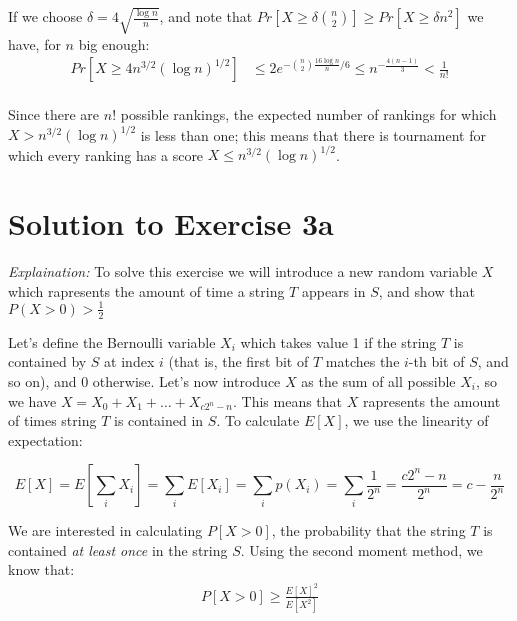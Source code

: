 \documentclass[a4paper,german]{article}
\begin{document}
If we choose $\delta = 4\sqrt{\frac{\log n}{n}}$, and note that $Pr [ X \geq \delta {n \choose 2} ] \geq Pr [ X \geq \delta n^2 ]  $ we have, for $n$ big enough:
\begin{equation}
\begin{aligned} 
	Pr [ X \geq 4n^{3/2}(\log n)^{1/2} ] &\leq 2 e^{-{n \choose 2}\frac{16\log n}{n} / 6} \leq 
	n^{-\frac{4(n-1)}{3}} < \frac{1}{n!}\\
\end{aligned}
\end{equation}

Since there are $n!$ possible rankings, the expected number of rankings for which $X > n^{3/2}(\log n)^{1/2}$ is less than one; this means that there is tournament for which every ranking has a score $X \leq n^{3/2}(\log n)^{1/2}$.





\section*{Solution to Exercise 3a}

\emph{Explaination:} To solve this exercise we will introduce a new random variable $X$ which
rapresents the amount of time a string $T$ appears in $S$, and show that $P(X > 0) > \frac{1}{2}$

\vspace{1em}

Let's define the Bernoulli variable $X_i$ which takes value 1 if the string $T$ is contained by $S$ at index $i$ (that is, the first bit of $T$ matches the $i$-th bit of $S$, and so on), and 0 otherwise. Let's now introduce $X$ as the sum of all possible $X_i$, so we have $X = X_0 + X_1 + \dots + X_{c2^n-n}$. This means that $X$ rapresents the amount of times string $T$ is contained in $S$.
To calculate $E[X]$, we use the linearity of expectation:

$$ E[X] = E\left[\sum_i X_i \right] = \sum_i E[X_i] = \sum_i p(X_i) = \sum_i \frac{1}{2^n} = 
\frac{c2^n - n}{2^n} = c - \frac{n}{2^n} $$

We are interested in calculating $P[X > 0]$, the probability that the string $T$ is contained \emph{at least once} in the string $S$. 
Using the second moment method, we know that:
\begin{equation}
\begin{aligned} 
 P[X > 0] \geq  \frac{E[X]^2}{E[X^2]}
\end{aligned}
\end{equation}
\end{document}
